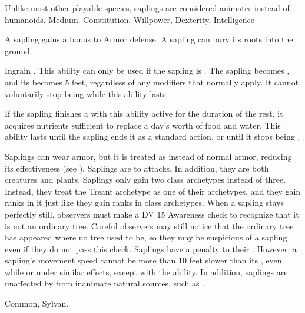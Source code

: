    Unlike most other playable species, saplings are considered animates instead of humanoids.
   Medium.
    Constitution,  Willpower,  Dexterity,  Intelligence
  \begin{raggeditemize}
     A sapling gains a  bonus to Armor defense.
     A sapling can bury its roots into the ground.
      \begin{activeability}{Ingrain}
        \abilityusagetime {}.
        \rankline
        This ability can only be used if the sapling is .
        The sapling becomes \braced, and its  becomes 5 feet, regardless of any modifiers that normally apply.
        It cannot voluntarily stop being  while this ability lasts.

        If the sapling finishes a  with this ability active for the duration of the rest, it acquires nutrients sufficient to replace a day's worth of food and water.
        This ability lasts until the sapling ends it as a standard action, or until it stops being .
      \end{activeability}
     Saplings can wear armor, but it is treated as  instead of normal armor, reducing its effectiveness (see ).
     Saplings are \vulnerable to \atFire attacks. In addition, they are both creatures and plants.
     Saplings only gain two class archetypes instead of three.
      Instead, they treat the Treant archetype as one of their archetypes, and they gain ranks in it just like they gain ranks in class archetypes.
     When a sapling stays perfectly still, observers must make a DV 15 Awareness check to recognize that it is not an ordinary tree.
      Careful observers may still notice that the ordinary tree has appeared where no tree used to be, so they may be suspicious of a sapling even if they do not pass this check.
     Saplings have a  penalty to their .
      However, a sapling's movement speed cannot be more than 10 feet slower than its , even while \slowed or under similar effects, except with the  ability.
      In addition, saplings are unaffected by  from inanimate natural sources, such as .
  \end{raggeditemize}
   Common, Sylvan.

